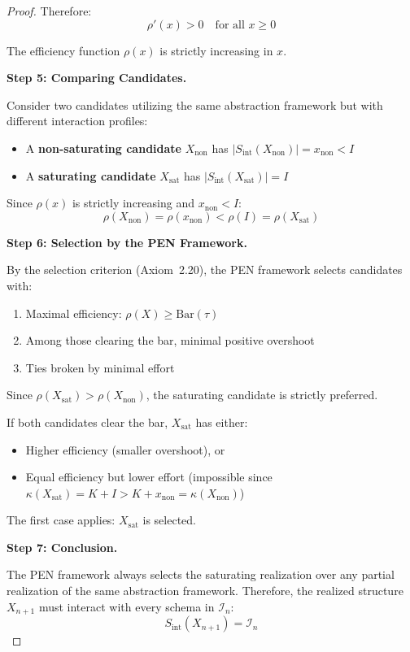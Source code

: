 \documentclass[11pt]{article}
\theoremstyle{definition}
\theoremstyle{remark}
\begin{document}
\begin{proof}
Therefore:
\[
\rho'(x) > 0 \quad \text{for all } x \geq 0
\]

The efficiency function $\rho(x)$ is strictly increasing in $x$.

\textbf{Step 5: Comparing Candidates.}

Consider two candidates utilizing the same abstraction framework but with different interaction
profiles:
\begin{itemize}
\item A \textbf{non-saturating candidate} $X_{\text{non}}$ has $|S_{\text{int}}(X_{\text{non}})| = x_{\text{non}} < I$
\item A \textbf{saturating candidate} $X_{\text{sat}}$ has $|S_{\text{int}}(X_{\text{sat}})| = I$
\end{itemize}

Since $\rho(x)$ is strictly increasing and $x_{\text{non}} < I$:
\[
\rho(X_{\text{non}}) = \rho(x_{\text{non}}) < \rho(I) = \rho(X_{\text{sat}})
\]

\textbf{Step 6: Selection by the PEN Framework.}

By the selection criterion (Axiom~2.20), the PEN framework selects candidates with:
\begin{enumerate}
\item Maximal efficiency: $\rho(X) \geq \text{Bar}(\tau)$
\item Among those clearing the bar, minimal positive overshoot
\item Ties broken by minimal effort
\end{enumerate}

Since $\rho(X_{\text{sat}}) > \rho(X_{\text{non}})$, the saturating candidate is strictly preferred.

If both candidates clear the bar, $X_{\text{sat}}$ has either:
\begin{itemize}
\item Higher efficiency (smaller overshoot), or
\item Equal efficiency but lower effort (impossible since $\kappa(X_{\text{sat}}) = K + I > K + x_{\text{non}} = \kappa(X_{\text{non}})$)
\end{itemize}

The first case applies: $X_{\text{sat}}$ is selected.

\textbf{Step 7: Conclusion.}

The PEN framework always selects the saturating realization over any partial realization of the
same abstraction framework. Therefore, the realized structure $X_{n+1}$ must interact with every
schema in $\mathcal{I}_n$:
\[
S_{\text{int}}(X_{n+1}) = \mathcal{I}_n
\]
\end{proof}
\end{document}
